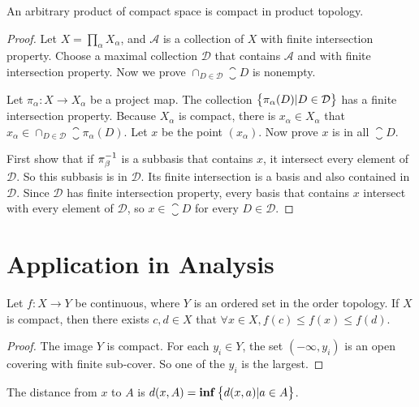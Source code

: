 \begin{theorem}
    An arbitrary product of compact space is compact in product topology.    
\end{theorem}
\begin{proof}
    Let $X = \prod_{\alpha} X_\alpha$, and $\mathcal{A}$ is a collection of $X$ with finite intersection property. Choose a maximal collection $\mathcal{D}$ that contains $\mathcal{A}$ and with finite intersection property. Now we prove $\cap_{D \in \mathcal{D}} \closure{D}$ is nonempty.
    
    Let $\pi_\alpha: X \rightarrow X_\alpha$ be a project map. The collection $\set{\pi_\alpha(D)| D \in \mathcal{D}}$ has a finite intersection property. Because $X_\alpha$ is compact, there is $x_\alpha \in X_\alpha$ that $x_\alpha \in \cap_{D \in \mathcal{D}} \closure{\pi_\alpha(D)}$. Let $x$ be the point $(x_\alpha)$. Now prove $x$ is in all $\closure{D}$.
    
    
    First show that if ${\pi}^{-1}_\beta$ is a subbasis that contains $x$, it intersect every element of $\mathcal{D}$. So this subbasis is in $\mathcal{D}$. Its finite intersection is a basis and also contained in $\mathcal{D}$. Since $\mathcal{D}$ has finite intersection property, every basis that contains $x$ intersect with every element of $\mathcal{D}$, so $x \in \closure{D}$ for every $D \in \mathcal{D}$.
\end{proof}





\section{Application in Analysis}

\begin{theorem}
    Let $f: X \rightarrow Y$ be continuous, where $Y$ is an ordered set in the order topology. If $X$ is compact, then there exists $c,d \in X$ that $\forall x \in X, f(c) \leq f(x) \leq f(d)$.
\end{theorem}
\begin{proof}
    The image $Y$ is compact. For each $y_i \in Y$, the set $(-\infty, y_i)$ is an open covering with finite sub-cover. So one of the $y_i$ is the largest.
\end{proof}

\begin{definition}
    The distance from $x$ to $A$ is $d(x,A) = \mathbf{inf} \set{d(x,a) | a \in A}$.
\end{definition}

